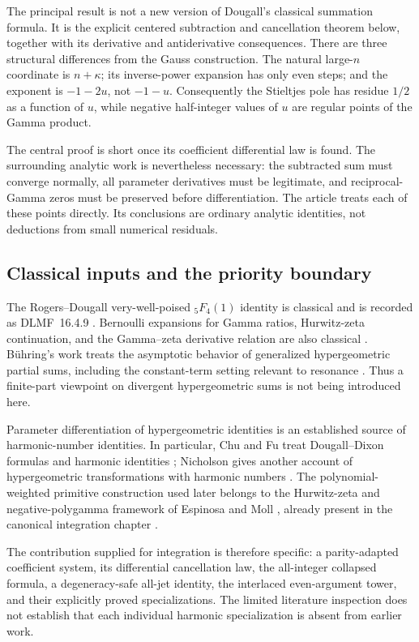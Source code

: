 \documentclass[11pt,letterpaper]{article}
\numberwithin{equation}{section}
\theoremstyle{definition}
\theoremstyle{remark}
\begin{document}
The principal result is not a new version of Dougall's classical summation
formula. It is the explicit centered subtraction and cancellation theorem
below, together with its derivative and antiderivative consequences. There
are three structural differences from the Gauss construction. The natural
large-$n$ coordinate is $n+\kappa$; its inverse-power expansion has only even
steps; and the exponent is $-1-2u$, not $-1-u$. Consequently the Stieltjes
pole has residue $1/2$ as a function of $u$, while negative half-integer
values of $u$ are regular points of the Gamma product.

The central proof is short once its coefficient differential law is found.
The surrounding analytic work is nevertheless necessary: the subtracted
sum must converge normally, all parameter derivatives must be legitimate,
and reciprocal-Gamma zeros must be preserved before differentiation. The
article treats each of these points directly. Its conclusions are ordinary
analytic identities, not deductions from small numerical residuals.

\subsection{Classical inputs and the priority boundary}

The Rogers--Dougall very-well-poised ${}_5F_4(1)$ identity is classical and is
recorded as DLMF~16.4.9 \cite{dlmf-dougall}. Bernoulli expansions for Gamma
ratios, Hurwitz-zeta continuation, and the Gamma--zeta derivative relation
are also classical \cite{dlmf-gamma,dlmf-hurwitz}. B\"uhring's work treats the
asymptotic behavior of generalized hypergeometric partial sums, including
the constant-term setting relevant to resonance \cite{buhring}. Thus a
finite-part viewpoint on divergent hypergeometric sums is not being
introduced here.

Parameter differentiation of hypergeometric identities is an established
source of harmonic-number identities. In particular, Chu and Fu treat
Dougall--Dixon formulas and harmonic identities \cite{chufu}; Nicholson
gives another account of hypergeometric transformations with harmonic
numbers \cite{nicholson}. The polynomial-weighted primitive construction
used later belongs to the Hurwitz-zeta and negative-polygamma framework of
Espinosa and Moll \cite{espinosa}, already present in the canonical
integration chapter \cite{repo-integration}.

The contribution supplied for integration is therefore specific: a
parity-adapted coefficient system, its differential cancellation law, the
all-integer collapsed formula, a degeneracy-safe all-jet identity, the
interlaced even-argument tower, and their explicitly proved specializations.
The limited literature inspection does not establish that each individual
harmonic specialization is absent from earlier work.
\end{document}
